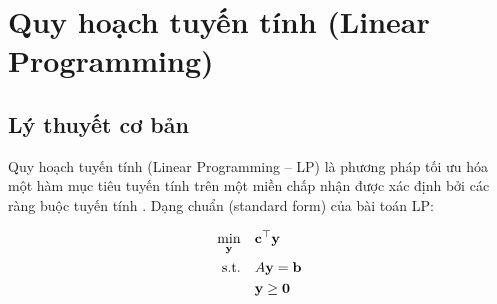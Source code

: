 \section{Quy hoạch tuyến tính (Linear Programming)}

\subsection{Lý thuyết cơ bản}

Quy hoạch tuyến tính (Linear Programming -- LP) là phương pháp tối ưu hóa một hàm mục tiêu tuyến tính trên một miền chấp nhận được xác định bởi các ràng buộc tuyến tính \cite{bertsimas1997lp}. Dạng chuẩn (standard form) của bài toán LP:

\begin{align}
    \min_{\mathbf{y}} \quad & \mathbf{c}^\top \mathbf{y} \label{eq:lp_obj}\\
    \text{s.t.} \quad & A\mathbf{y} = \mathbf{b} \notag\\
    & \mathbf{y} \geq \mathbf{0} \notag
\end{align}

